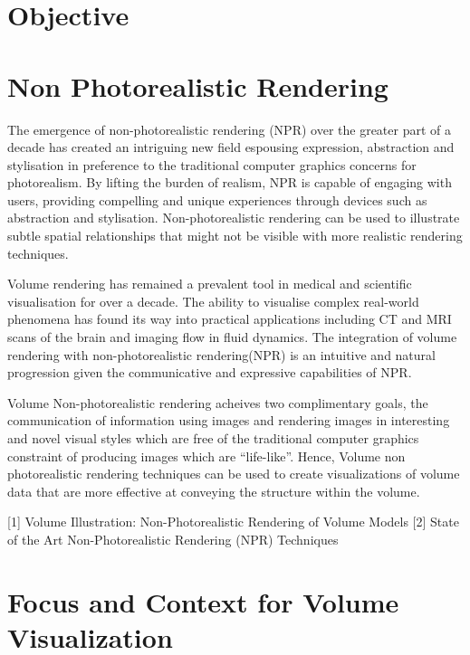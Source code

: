 \section{Objective}







\section{Non Photorealistic Rendering }

The emergence of non-photorealistic rendering (NPR) over the greater part of a decade has created an intriguing new field espousing expression, abstraction and stylisation in preference to the traditional computer graphics concerns for photorealism. By lifting the burden of realism, NPR is capable of engaging with users, providing compelling and unique experiences through devices such as abstraction and stylisation. Non-photorealistic rendering can be used to illustrate subtle spatial relationships that might not be visible with more realistic rendering techniques. 

Volume rendering has remained a prevalent tool in medical and scientific visualisation for over a decade. The ability to visualise complex real-world phenomena has found its way into practical applications including CT and MRI scans of the brain and imaging flow in fluid dynamics. The integration of volume rendering with non-photorealistic rendering(NPR) is an intuitive and natural progression given the communicative and expressive capabilities of NPR. 

Volume Non-photorealistic rendering acheives two complimentary goals, the communication of information using images and rendering images in interesting and novel visual styles which are free of the traditional computer graphics constraint of producing images which are “life-like”. Hence, Volume non photorealistic rendering techniques can be used to create visualizations of volume data that are more effective at conveying the structure within the volume.

[1] Volume Illustration: Non-Photorealistic Rendering of Volume Models
[2] State of the Art Non-Photorealistic Rendering (NPR) Techniques


\section{Focus and Context for Volume Visualization }

